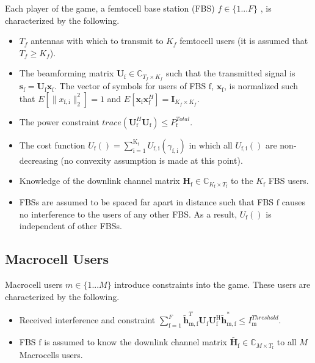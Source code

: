 \documentclass[12pt,a4paper]{report}
\begin{document}
Each player of the game, a femtocell base station (FBS) $f \in \{1 ... F\}$ , is characterized by the following.
\begin{itemize}
\item 
$T_f$ antennas with which to transmit to $K_f$ femtocell users (it is assumed that $T_f \geq K_f$).
\\
\item 
	The beamforming matrix $\mathbf{U}_{\mathrm{f}} \in \mathbb{C}_{T_f \times K_f}$ such that the transmitted 		
	signal is $\mathbf{s}_{\mathrm{f}
	}= \mathbf{U_{\mathrm{f}}}\mathbf{x_{\mathrm{f}}}$. The 		
	vector of symbols for users of FBS $\text{f}$, $\mathbf{x_{\mathrm{f}}}$, is  normalized such that $E[\|x_{\mathrm{f,i}}
	\|_2^2]=1$ and $E[\mathbf{x}_{\mathrm{f}}\mathbf{x}_{\mathrm{f}}^H]=\mathbf{I}_{K_f \times K_f}$.
\\
\item 
	The power constraint $trace(\mathbf{U}_{\text{f}}^H\mathbf{U}_{\text{f}}) \leq P^{Total}_{\text{f}} $.

\item 
	The cost function $U_{\text{f}}() =
	\sum_{\mathrm{i=1}}^{\mathrm{K_{\text{f}}}}
    	 U_{\mathrm{f,i}}(\gamma_{\mathrm{f,i}}) $
    	in which all $U_{\mathrm{f,i}}()$ are non-decreasing (no convexity assumption is made at this point).

\item 
	Knowledge of the downlink channel matrix $\mathbf{H_\mathrm{f}} \in \mathbb{C}_{K_{\text{f}} \times T_{\text{f}}} $ to the $K_{\text{f}}$ FBS users.
\\
\item
	 FBSs are assumed to be spaced far apart in distance such that FBS $\text{f}$ 
	 causes no interference to the users of any other FBS. As a result, $U_{\text{f}}()$ is independent of other FBSs.
\end{itemize}

\subsection{Macrocell Users}
Macrocell users $m \in \{1 ... M\}$ introduce constraints into the game. These users are characterized by the following.

\begin{itemize}
\item 
	Received interference and constraint
	$\sum^F_{\text{f}=1} \mathbf{\tilde{h}}_{\mathrm{m,f}}^T  \mathbf{U_{\mathrm{f}}} 						
	\mathbf{U_{\mathrm{f}}^{\mathrm{H}}} \mathbf{\tilde{h}_{\mathrm{m,f}}^*} \leq I^{Threshold}		
	_{\mathrm{m}} $.

\item 
	FBS $\text{f}$ is assumed to know the downlink channel matrix $\tilde{\mathbf{H}_{\mathrm{f}}} \in \mathbb{C}_{M \times T_{\text{f}}}$ to all $M$ Macrocells users.
\\
\end{itemize}
\end{document}
